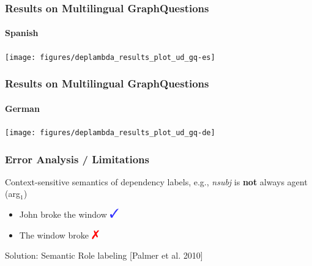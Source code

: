 \documentclass[mathserif,12pt]{beamer}
\newcommand{\cmark}{\ding{51}}%
\newcommand{\xmark}{\ding{55}}%
\newcommand{\hlight}[1]{{\color{blue!80} #1}}
\begin{document}
\begin{frame}
\end{frame}

\begin{frame}
\frametitle{Results on Multilingual GraphQuestions}
\framesubtitle{Spanish}
\centering
\large
\vspace{0.4em}
\texttt{[image: figures/deplambda\_results\_plot\_ud\_gq-es]}
\end{frame}

\begin{frame}
\frametitle{Results on Multilingual GraphQuestions}
\framesubtitle{German}
\centering
\large
\vspace{0.4em}
\texttt{[image: figures/deplambda\_results\_plot\_ud\_gq-de]}
\end{frame}

\begin{frame}
\frametitle{Error Analysis / Limitations}
\large
Context-sensitive semantics of dependency labels, e.g., \textit{nsubj} is \textbf{not} always agent (arg$_1$)
\begin{itemize}
\item John broke the window $\Large \textbf{\hlight{\cmark}}$
\vspace{1em}
\item The {\color{red} window} broke $\Large \textbf{\color{red} {\xmark}}$
\end{itemize}

\vspace{2em}
\hlight{Solution:} Semantic Role labeling [\small Palmer et al. 2010] 
\end{frame}
\end{document}
